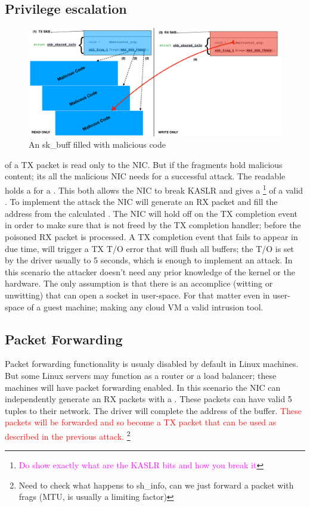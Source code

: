 \subsection{Privilege escalation}
\begin{figure}
    \centering
    \includegraphics[width=1.1\linewidth]{figs/paylopad_both.pdf}
    \caption{An sk\_buff filled with malicious code}
    \label{fig:payload}
\end{figure}
\shinfo of a TX packet is read only to the NIC.
But if the fragments hold malicious content; its all the malicious NIC needs for a successful attack. The readable \shinfo holds a \kva for a \page. This both allows the NIC to break KASLR and gives a \kva\footnote{\textcolor{magenta}{Do show exactly what are the KASLR bits and how you break it}} of a valid \mabaf. To implement the attack the NIC will generate an RX packet and fill the \uarg address from the calculated \kva.
The NIC will hold off on the TX completion event in order to make sure that \kva is not freed by the TX completion handler; before the poisoned RX packet is processed. A TX completion event that fails to appear in due time, will trigger a TX T/O error that will flush all buffers; the T/O is set by the driver usually to 5 seconds, which is enough to implement an attack.\newline
In this scenario the attacker doesn't need any prior knowledge of the kernel or the hardware. The only assumption is that there is an accomplice (witting or unwitting) that can open a socket in user-space. For that matter even in user-space of a guest machine; making any cloud VM a valid intrusion tool.

\subsection{Packet Forwarding}
Packet forwarding functionality is usualy disabled by default in Linux machines. But some Linux servers may function as a router or a load balancer; these machines will have packet forwarding enabled. In this scenario the NIC can independently generate an RX packets with a \mabaf. These packets can have valid 5 tuples to their network. The driver will complete the \page address of the buffer. \textcolor{red}{These packets will be forwarded and so become a TX packet that can be used as described in the previous attack.} \footnote{Need to check what happens to sh\_info, can we just forward a packet with frags (MTU, is usually a limiting factor)}

